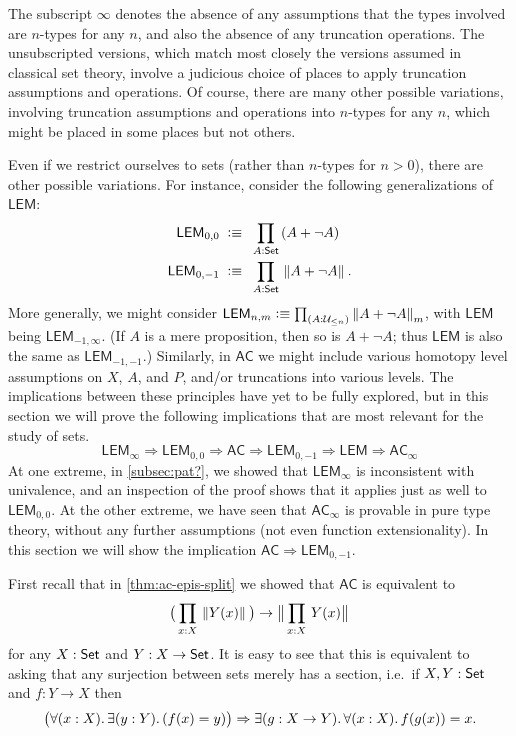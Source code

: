 The subscript $\infty$ denotes the absence of any assumptions that the types involved are $n$-types for any $n$, and also the absence of any truncation operations.
The unsubscripted versions, which match most closely the versions assumed in classical set theory, involve a judicious choice of places to apply truncation assumptions and operations.
Of course, there are many other possible variations, involving truncation assumptions and operations into $n$-types for any $n$, which might be placed in some places but not others.

Even if we restrict ourselves to sets (rather than $n$-types for $n>0$), there are other possible variations.
For instance, consider the following generalizations of $\mathsf{LEM}$:
%
\begin{align*}
  \mathsf{LEM}_{0,0}\;\defeq\;&\ \prd{A:\set} (A + \neg A) \\
  \mathsf{LEM}_{0,-1}\;\defeq\;&\ \prd{A:\set} \brck{A + \neg A}.
\end{align*}
%
More generally, we might consider $\mathsf{LEM}_{n,m}\defeq \prd{A:\ntype{n}} \trunc m{A+\neg A}$, with $\mathsf{LEM}$ being $\mathsf{LEM}_{-1,\infty}$.
(If $A$ is a mere proposition, then so is $A+\neg A$; thus $\mathsf{LEM}$ is also the same as $\mathsf{LEM}_{-1,-1}$.)
Similarly, in $\mathsf{AC}$ we might include various homotopy level assumptions on $X$, $A$, and $P$, and/or truncations into various levels.
The implications between these principles have yet to be fully explored, but in this section we will prove the following implications that are most relevant for the study of sets.
\[
\mathsf{LEM}_\infty \Rightarrow \mathsf{LEM}_{0,0} \Rightarrow  \mathsf{AC} \Rightarrow \mathsf{LEM}_{0,-1} \Rightarrow \mathsf{LEM}\Rightarrow \mathsf{AC}_\infty
\]
At one extreme, in \autoref{subsec:pat?}, we showed that $\mathsf{LEM}_\infty$ is inconsistent with univalence, and an inspection of the proof shows that it applies just as well to $\mathsf{LEM}_{0,0}$.
At the other extreme, we have seen that $\mathsf{AC}_\infty$ is provable in pure type theory, without any further assumptions (not even function extensionality).
In this section we will show the implication $\mathsf{AC} \Rightarrow \mathsf{LEM}_{0,-1}$.

First recall that in \autoref{thm:ac-epis-split} we showed that $\mathsf{AC}$ is equivalent to
\[ \big(\prd{x:X} \brck{Y(x)}\big) \to \bbrck{\prd{x:X} Y(x)} \]
for any $X:\mathsf{Set}$ and $Y:X\to\mathsf{Set}$.
It is easy to see that this is equivalent to asking that any surjection between sets merely has a section, i.e.\ if $X,Y:\mathsf{Set}$ and $f:Y\to X$ then
\[ \big(\fall{x:X}\exis{y:Y} (f(x)=y)\big) \Rightarrow \exis{g:X\to Y}\fall{x:X} f(g(x))=x. \]

